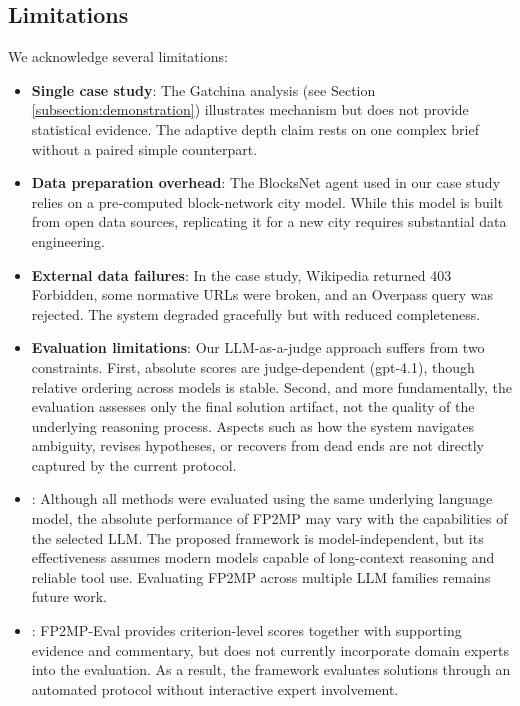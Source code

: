 \subsection{Limitations}

We acknowledge several limitations:

\begin{itemize}
    \item \textbf{Single case study}: The Gatchina analysis (see Section \ref{subsection:demonstration}) illustrates mechanism but does not provide statistical evidence. The adaptive depth claim rests on one complex brief without a paired simple counterpart.
    \item \textbf{Data preparation overhead}: The BlocksNet agent used in our case study relies on a pre‑computed block-network city model. While this model is built from open data sources, replicating it for a new city requires substantial data engineering.
    \item \textbf{External data failures}: In the case study, Wikipedia returned 403 Forbidden, some normative URLs were broken, and an Overpass query was rejected. The system degraded gracefully but with reduced completeness.
    \item \textbf{Evaluation limitations}: Our LLM-as-a-judge approach suffers from two constraints. First, absolute scores are judge-dependent (gpt-4.1), though relative ordering across models is stable. Second, and more fundamentally, the evaluation assesses only the final solution artifact, not the quality of the underlying reasoning process. Aspects such as how the system navigates ambiguity, revises hypotheses, or recovers from dead ends are not directly captured by the current protocol.
    \item {}: Although all methods were evaluated using the same underlying language model, the absolute performance of FP2MP may vary with the capabilities of the selected LLM. The proposed framework is model-independent, but its effectiveness assumes modern models capable of long-context reasoning and reliable tool use. Evaluating FP2MP across multiple LLM families remains future work.
    \item {}: FP2MP-Eval provides criterion-level scores together with supporting evidence and commentary, but does not currently incorporate domain experts into the evaluation.
    As a result, the framework evaluates solutions through an automated protocol without interactive expert involvement.
\end{itemize}